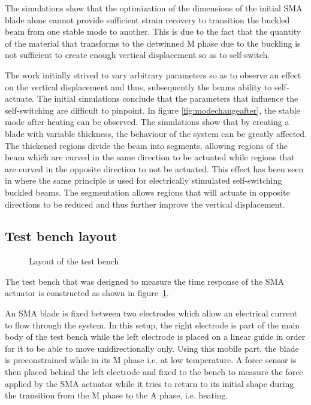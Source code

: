 The simulations show that the optimization of the dimensions of the initial SMA blade alone cannot provide sufficient strain recovery to transition the buckled beam from one stable mode to another. This is due to the fact that the quantity of the material that transforms to the detwinned M phase due to the buckling is not sufficient to create enough vertical displacement so as to self-switch.

The work initially strived to vary arbitrary parameters so as to observe an effect on the vertical displacement and thus, subsequently the beams ability to self-actuate. The initial simulations conclude that the parameters that influence the self-switching are difficult to pinpoint. In figure \ref{fig:modechangeafter}, the stable mode after heating can be observed. The simulations show that by creating a blade with variable thickness, the behaviour of the system can be greatly affected. The thickened regions divide the beam into segments, allowing regions of the beam which are curved in the same direction to be actuated while regions that are curved in the opposite direction to not be actuated. This effect has been seen in \cite{rossiter_self-switching_2006} where the same principle is used for electrically stimulated self-switching buckled beams. The segmentation allows regions that will actuate in opposite directions to be reduced and thus further improve the vertical displacement.

\subsection{Test bench layout}
\begin{figure}
	\vspace{-10pt}
	\centering
	\def\svgwidth{0.5\columnwidth}
	
	\caption{Layout of the test bench}
	\vspace{-5pt}
	\label{fig:test_bench}
\end{figure}

The test bench that was designed to measure the time response of the SMA actuator is constructed as shown in figure~\ref{fig:test_bench}.

An SMA blade is fixed between two electrodes which allow an electrical current to flow through the system. In this setup, the right electrode is part of the main body of the test bench while the left electrode is placed on a linear guide in order for it to be able to move unidirectionally only. Using this mobile part, the blade is preconstrained while in its M phase i.e. at low temperature. A force sensor is then placed behind the left electrode and fixed to the bench to measure the force applied by the SMA actuator while it tries to return to its initial shape during the transition from the M phase to the A phase, i.e. heating.

